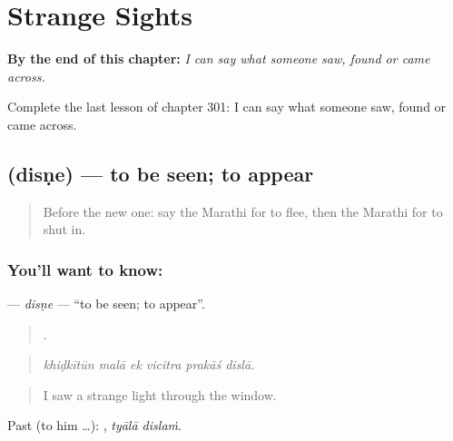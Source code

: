 
\chapter{Strange Sights}
\label{ch:mr-strange-sights}

\begin{chapteropening}
\textbf{By the end of this chapter:} \emph{I can say what someone saw, found or came across.}

Complete the last lesson of chapter 301: I can say what someone saw, found or came across.
\end{chapteropening}

\section[\texorpdfstring{\mr{दिसणे} (disṇe)}{दिसणे (disṇe)}]{ (disṇe) — to be seen; to appear}

\label{lesson:MR-C301-disne}



\begin{quote}
Before the new one: say the Marathi for to flee, then the Marathi for to shut in.
\end{quote}

\subsection*{You'll want to know: }
\textbf{} — \emph{disṇe} — \textquotedblleft{}to be seen; to appear\textquotedblright{}.

\begin{quote}
     .
\end{quote}

\begin{quote}
\emph{khiḍkītūn malā ek vicitra prakāś dislā.}
\end{quote}

\begin{quote}
I saw a strange light through the window.
\end{quote}

Past (to him …):  , \emph{tyālā dislaṁ}.

